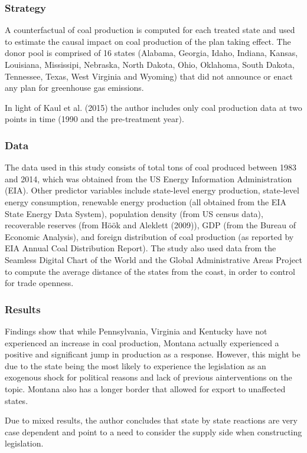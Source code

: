 \documentclass[12pt,a4paper,draft]{article}
\begin{document}
\subsubsection*{Strategy}
A counterfactual of coal production is computed for each treated state and used to 
estimate the causal impact on coal production of the plan taking effect. 
The donor pool is comprised of 16 states (Alabama, Georgia, Idaho, Indiana, Kansas, 
Louisiana, Mississipi, Nebraska, North Dakota, Ohio, Oklahoma, South Dakota, Tennessee, 
Texas, West Virginia and Wyoming) that did not announce or enact any plan for 
greenhouse gas emissions.

In light of Kaul et al. (2015) the author includes only coal production data at two 
points in time (1990 and the pre-treatment year).


\subsubsection*{Data}
The data used in this study consists of total tons of coal produced between 1983 and 
2014, which was obtained from the US Energy Information Administration (EIA).
Other predictor variables include state-level energy production, state-level energy 
consumption, renewable energy production (all obtained from the EIA State Energy Data 
System), population density (from US census data), recoverable reserves (from Höök and 
Aleklett (2009)), GDP (from the Bureau of Economic Analysis), and foreign distribution 
of coal production (as reported by EIA Annual Coal Distribution Report). 
The study also used data from the Seamless Digital Chart of the World and the Global 
Administrative Areas Project to compute the average distance of the states from the 
coast, in order to control for trade openness.

\subsubsection*{Results}
Findings show that while Pennsylvania, Virginia and Kentucky have not experienced an 
increase in coal production, Montana actually experienced a positive and significant 
jump in production as a response. 
However, this might be due to the state being the most likely to experience the 
legislation as an exogenous shock for political reasons and lack of previous ainterventions 
on the topic. Montana also has a longer border that allowed for export to unaffected 
states.
 
Due to mixed results, the author concludes that state by state reactions are very case 
dependent and point to a need to consider the supply side when constructing legislation.
\end{document}
